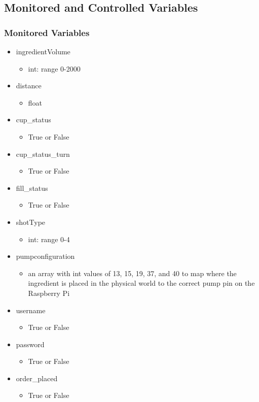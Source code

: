 \documentclass{article}
\begin{document}
\subsection{Monitored and Controlled Variables}
\subsubsection{Monitored Variables} %
    \begin{itemize}
        \item ingredientVolume
        \begin{itemize}
            \item int: range 0-2000
        \end{itemize}
        \item distance
        \begin{itemize}
            \item float
        \end{itemize}
        \item cup\_status
        \begin{itemize}
            \item True or False
        \end{itemize}
        \item cup\_status\_turn
        \begin{itemize}
            \item True or False
        \end{itemize}
        \item fill\_status
        \begin{itemize}
            \item True or False
        \end{itemize}
        \item shotType
        \begin{itemize}
            \item int: range 0-4
        \end{itemize}
        \item pumpconfiguration
        \begin{itemize}
            \item an array with int values of 13, 15, 19, 37, and 40 to map where the ingredient is placed in the physical world to the correct pump pin on the Raspberry Pi
        \end{itemize}
        \item username
        \begin{itemize}
            \item True or False
        \end{itemize}
        \item password
        \begin{itemize}
            \item True or False
        \end{itemize}
        \item order_placed
        \begin{itemize}
            \item True or False
        \end{itemize}
 \end{itemize}
    
\end{document}
